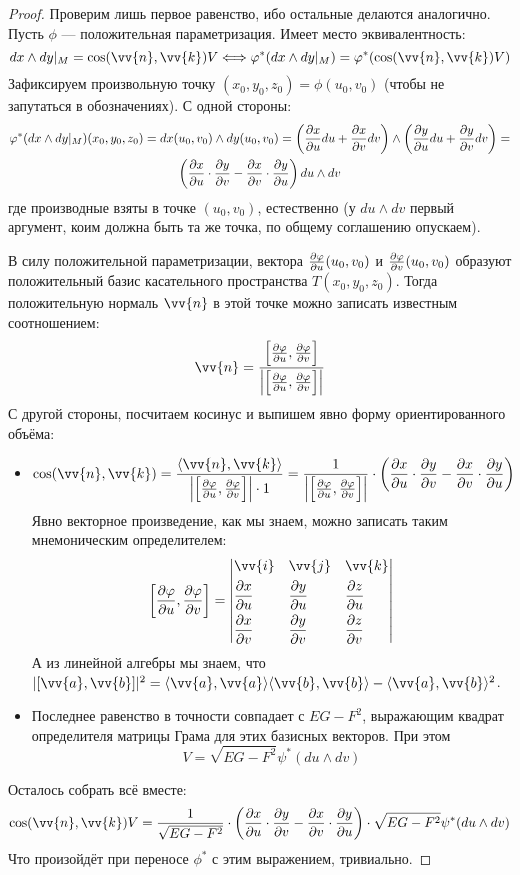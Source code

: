 \begin{proof}
	Проверим лишь первое равенство, ибо остальные делаются аналогично. Пусть $\phi$ --- положительная параметризация. Имеет место эквивалентность:
	\[
		dx \wedge dy|_M = \cos(\vv{n}, \vv{k})V \Longleftrightarrow \phi^*(dx \wedge dy|_M) = \phi^*(\cos(\vv{n}, \vv{k})V)
	\]
	Зафиксируем произвольную точку $(x_0, y_0, z_0) = \phi(u_0, v_0)$ (чтобы не запутаться в обозначениях). С одной стороны:
	\begin{multline*}
		\varphi^*(dx \wedge dy|_M)(x_0, y_0, z_0) = dx(u_0, v_0) \wedge dy(u_0, v_0) = \left(\frac{\partial x}{\partial u}du + \frac{\partial x}{\partial v}dv\right) \wedge \left(\frac{\partial y}{\partial u}du + \frac{\partial y}{\partial v}dv\right) =
		\\
		\left(\frac{\partial x}{\partial u} \cdot \frac{\partial y}{\partial v} - \frac{\partial x}{\partial v} \cdot \frac{\partial y}{\partial u}\right)du \wedge dv
	\end{multline*}
	где производные взяты в точке $(u_0, v_0)$, естественно (у $du \wedge dv$ первый аргумент, коим должна быть та же точка, по общему соглашению опускаем).
	
	В силу положительной параметризации, вектора $\frac{\partial \varphi}{\partial u}(u_0, v_0)$ и $\frac{\partial \varphi}{\partial v}(u_0, v_0)$ образуют положительный базис касательного пространства $T(x_0, y_0, z_0)$. Тогда положительную нормаль $\vv{n}$ в этой точке можно записать известным соотношением:
	\[
		\vv{n} = \frac{\sbr{\pd{\phi}{u}, \pd{\phi}{v}}}{\md{\sbr{\pd{\phi}{u}, \pd{\phi}{v}}}}
	\]
	С другой стороны, посчитаем косинус и выпишем явно форму ориентированного объёма:
	\begin{itemize}
		\item \[
			\cos(\vv{n}, \vv{k}) = \frac{\ntbr{\vv{n}, \vv{k}}}{\md{\sbr{\pd{\phi}{u}, \pd{\phi}{v}}} \cdot 1} = \frac{1}{\md{\sbr{\pd{\phi}{u}, \pd{\phi}{v}}}} \cdot \ps{\pd{x}{u} \cdot \pd{y}{v} - \pd{x}{v} \cdot \pd{y}{u}}
		\]
		Явно векторное произведение, как мы знаем, можно записать таким мнемоническим определителем:
		\[
			\sbr{\pd{\phi}{u}, \pd{\phi}{v}} = \Det{
				&\vv{i}& &\vv{j}& &\vv{k}
				\\
				&\pd{x}{u}& &\pd{y}{u}& &\pd{z}{u}
				\\
				&\pd{x}{v}& &\pd{y}{v}& &\pd{z}{v}
			}
		\]
		А из линейной алгебры мы знаем, что $|[\vv{a}, \vv{b}]|^2 = \ntbr{\vv{a}, \vv{a}}\ntbr{\vv{b}, \vv{b}} - \ntbr{\vv{a}, \vv{b}}^2$.
		
		\item Последнее равенство в точности совпадает с $EG - F^2$, выражающим квадрат определителя матрицы Грама для этих базисных векторов. При этом
		\[
			V = \sqrt{EG - F^2} \psi^*(du \wedge dv)
		\]
	\end{itemize}
	Осталось собрать всё вместе:
	\[
		\cos(\vv{n}, \vv{k})V = \frac{1}{\sqrt{EG - F^2}} \cdot \ps{\pd{x}{u} \cdot \pd{y}{v} - \pd{x}{v} \cdot \pd{y}{u}} \cdot \sqrt{EG - F^2} \psi^*(du \wedge dv)
	\]
	Что произойдёт при переносе $\phi^*$ с этим выражением, тривиально.
\end{proof}

